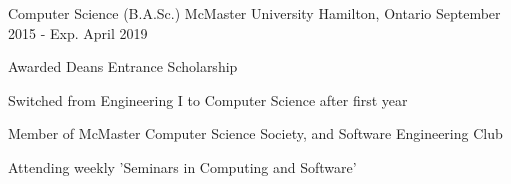

\begin{cventries}

  \cventry
    {Computer Science (B.A.Sc.)} %
    {McMaster University} %
    {Hamilton, Ontario} %
    {September 2015 - Exp. April 2019} %
    {
      \begin{cvitems} %
        \item {Awarded Deans Entrance Scholarship}
        \item {Switched from Engineering I to Computer Science after first year}
        \item {Member of McMaster Computer Science Society, and Software Engineering Club}
        \item {Attending weekly 'Seminars in Computing and Software'}
      \end{cvitems}
    }

\end{cventries}
